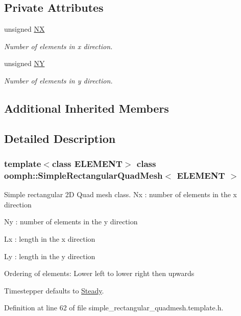 \subsection*{Private Attributes}
\begin{DoxyCompactItemize}
\item 
unsigned \hyperlink{classoomph_1_1SimpleRectangularQuadMesh_ab6ec406039698222f051d4ec977f1788}{NX}
\begin{DoxyCompactList}\small\item\em Number of elements in x direction. \end{DoxyCompactList}\item 
unsigned \hyperlink{classoomph_1_1SimpleRectangularQuadMesh_a6db96125790b46858fb00eef46bf7201}{NY}
\begin{DoxyCompactList}\small\item\em Number of elements in y direction. \end{DoxyCompactList}\end{DoxyCompactItemize}
\subsection*{Additional Inherited Members}


\subsection{Detailed Description}
\subsubsection*{template$<$class E\+L\+E\+M\+E\+NT$>$\newline
class oomph\+::\+Simple\+Rectangular\+Quad\+Mesh$<$ E\+L\+E\+M\+E\+N\+T $>$}

Simple rectangular 2D Quad mesh class. Nx \+: number of elements in the x direction

Ny \+: number of elements in the y direction

Lx \+: length in the x direction

Ly \+: length in the y direction

Ordering of elements\+: \textquotesingle{}Lower left\textquotesingle{} to \textquotesingle{}lower right\textquotesingle{} then \textquotesingle{}upwards\textquotesingle{}

Timestepper defaults to \hyperlink{classoomph_1_1Steady}{Steady}. 

Definition at line 62 of file simple\+\_\+rectangular\+\_\+quadmesh.\+template.\+h.



